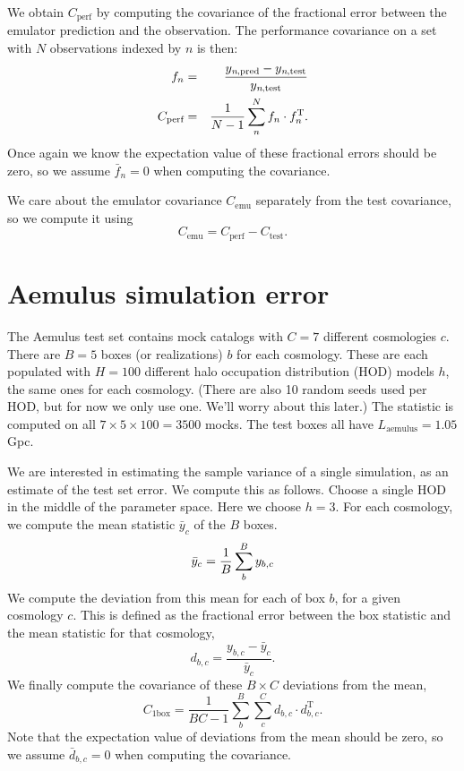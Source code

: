 \documentclass[12pt]{article}
\newcommand{\T}{^{\mathrm{T}}}
\newcommand{\cov}[1]{C_\text{#1}}
\newcommand{\y}[1]{y_{\text{#1}}}
\begin{document}
We obtain $\cov{perf}$ by computing the covariance of the fractional error between the emulator prediction and the observation.
The performance covariance on a set with $N$ observations indexed by $n$ is then:
\begin{eqnarray}
    f_n &=& \frac{ \y{\textit{n},pred} - \y{\textit{n},test} }{ \y{\textit{n},test} } \\
    \cov{perf} &=& \frac{1}{N-1} \sum_n^N f_n \cdot f_n\T.
\end{eqnarray}
Once again we know the expectation value of these fractional errors should be zero, so we assume $\bar{f}_{n}=0$ when computing the covariance.

We care about the emulator covariance $\cov{emu}$ separately from the test covariance, so we compute it using
\label{eq:emu}
\begin{equation}
    \cov{emu} = \cov{perf} - \cov{test}.
\end{equation}


\section{Aemulus simulation error}

The Aemulus test set contains mock catalogs with $C=7$ different cosmologies $c$. 
There are $B=5$ boxes (or realizations) $b$ for each cosmology. 
These are each populated with $H=100$ different halo occupation distribution (HOD) models $h$, the same ones for each cosmology. 
(There are also 10 random seeds used per HOD, but for now we only use one. We'll worry about this later.)
The statistic is computed on all $7 \times 5 \times 100 = 3500$ mocks. 
The test boxes all have $L_\text{aemulus}=1.05$ Gpc.

We are interested in estimating the sample variance of a single simulation, as an estimate of the test set error.
We compute this as follows. 
Choose a single HOD in the middle of the parameter space.
Here we choose $h=3$.
For each cosmology, we compute the mean statistic $\bar{y}_{c}$ of the $B$ boxes.
\begin{equation}
    \bar{y}_{c} = \frac{1}{B} \sum_b^B {y_{b,c}} \\
\end{equation}
We compute the deviation from this mean for each of box $b$, for a given cosmology $c$. 
This is defined as the fractional error between the box statistic and the mean statistic for that cosmology,
\begin{equation}
    d_{b,c} = \frac{ {y_{b,c} - \bar{y}_{c}} } {\bar{y}_{c}}.
\end{equation}
We finally compute the covariance of these $B \times C$ deviations from the mean,
\begin{equation}
    \cov{1box} = \frac{1}{BC-1} \sum_{b}^B \sum_{c}^C d_{b,c} \cdot d_{b,c}\T.
\end{equation}
Note that the expectation value of deviations from the mean should be zero, so we assume $\bar{d}_{b,c}=0$ when computing the covariance.
\end{document}
